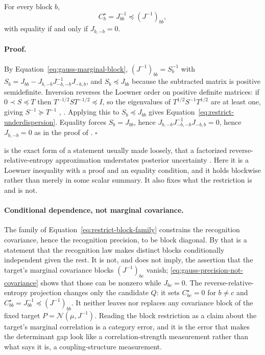 For every block $b$,
\begin{equation}
C_b^\star=J_{bb}^{-1}\preceq\left(J^{-1}\right)_{bb},
\label{eq:restrict-underdispersion}
\end{equation}
with equality if and only if $J_{b,-b}=0$. 

\paragraph{Proof.}
By Equation~\eqref{eq:gauss-marginal-block}, $(J^{-1})_{bb}=S_b^{-1}$ with $S_b=J_{bb}-J_{b,-b}J_{-b,-b}^{-1}J_{-b,b}$, and $S_b\preceq J_{bb}$ because the subtracted matrix is positive semidefinite. Inversion reverses the Loewner order on positive definite matrices: if $0\prec S\preceq T$ then $T^{-1/2}ST^{-1/2}\preceq I$, so the eigenvalues of $T^{1/2}S^{-1}T^{1/2}$ are at least one, giving $S^{-1}\succeq T^{-1}$ \citep[\S7.7]{HornJohnson2013}, \citep[Ch.~V]{Bhatia2007}. Applying this to $S_b\preceq J_{bb}$ gives Equation~\eqref{eq:restrict-underdispersion}. Equality forces $S_b=J_{bb}$, hence $J_{b,-b}J_{-b,-b}^{-1}J_{-b,b}=0$, hence $J_{b,-b}=0$ as in the proof of . $\square$

 is the exact form of a statement usually made loosely, that a factorized reverse-relative-entropy approximation understates posterior uncertainty \citep{Bishop2006,Blei2017,TurnerSahani2011}. Here it is a Loewner inequality with a proof and an equality condition, and it holds blockwise rather than merely in some scalar summary. It also fixes what the restriction is and is not.

\paragraph{Conditional dependence, not marginal covariance.}
The family of Equation~\eqref{eq:restrict-block-family} constrains the recognition covariance, hence the recognition precision, to be block diagonal. By  that is a statement that the recognition law makes distinct blocks conditionally independent given the rest. It is not, and does not imply, the assertion that the target's marginal covariance blocks $(J^{-1})_{bc}$ vanish; \eqref{eq:gauss-precision-not-covariance} shows that those can be nonzero while $J_{bc}=0$. The reverse-relative-entropy projection changes only the candidate \(Q\): it sets \(C^\star_{bc}=0\) for \(b\neq c\) and \(C^\star_{bb}=J_{bb}^{-1}\preceq(J^{-1})_{bb}\). It neither leaves nor replaces any covariance block of the fixed target \(P=\mathcal N(\mu,J^{-1})\). Reading the block restriction as a claim about the target's marginal correlation is a category error, and it is the error that makes the determinant gap look like a correlation-strength measurement rather than what  says it is, a coupling-structure measurement. 

